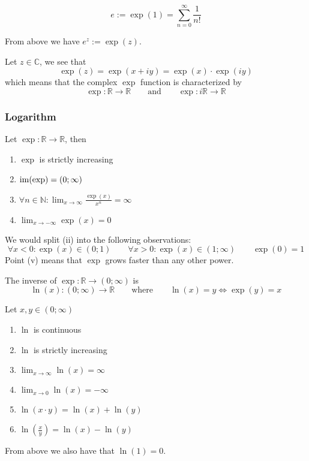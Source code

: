 \begin{definition}
   \[e := \exp(1) = \sum_{n=0}^\infty \frac{1}{n!}\]
\end{definition}
\begin{remark}[Notation]
   From above we have \(e^z := \exp(z)\).
\end{remark}

Let \(z \in \mathbb{C}\), we see that
\[\exp(z) = \exp(x + iy) = \exp(x) \cdot \exp(iy)\]
 which means that the complex \(\exp\) function is characterized by
\[\exp: \mathbb{R} \to \mathbb{R} \qquad\text{and}\qquad \exp: i\mathbb{R} \to \mathbb{R}\]

\subsubsection{Logarithm}
\begin{proposition}
   Let \(\exp: \mathbb{R} \to \mathbb{R}\), then
   \begin{enumerate}[label=\roman*, align=Center]
      \item \(\exp\) is strictly increasing
      \item \(\operatorname{im}(\exp) = (0; \infty)\)
      \item \(\forall n \in \mathbb{N}: \lim_{x \to \infty} \frac{\exp(x)}{x^n} = \infty\)
      \item \(\lim_{x \to -\infty} \exp(x) = 0\)
   \end{enumerate}
\end{proposition}
\begin{remark}[Intuition]
   We would split (ii) into the following observations:
   \[\forall x < 0: \exp(x) \in (0; 1) \qquad \forall x > 0: \exp(x) \in (1; \infty) \qquad \exp(0) = 1\]
   Point (v) means that \(\exp\) grows faster than any other power.
\end{remark}

\begin{definition}[Logarithm]
   The inverse of \(\exp: \mathbb{R} \to (0; \infty)\) is
   \[\ln(x): (0; \infty) \to \mathbb{R} \qquad\text{where}\qquad \ln(x) = y \iff \exp(y) = x\]
\end{definition}

\begin{proposition}[Properties]
   Let \(x, y \in (0; \infty)\)
   \begin{enumerate}[label=\roman*, align=Center]
      \item \(\ln\) is continuous
      \item \(\ln\) is strictly increasing
      \item \(\lim_{x \to \infty} \ln(x) = \infty\)
      \item \(\lim_{x \to 0} \ln(x) = -\infty\)
      \item \(\ln(x \cdot y) = \ln(x) + \ln(y)\)
      \item \(\ln\left(\frac{x}{y}\right) = \ln(x) - \ln(y)\)
   \end{enumerate}
\end{proposition}
\begin{remark}
   From above we also have that \(\ln(1) = 0\).
\end{remark}

